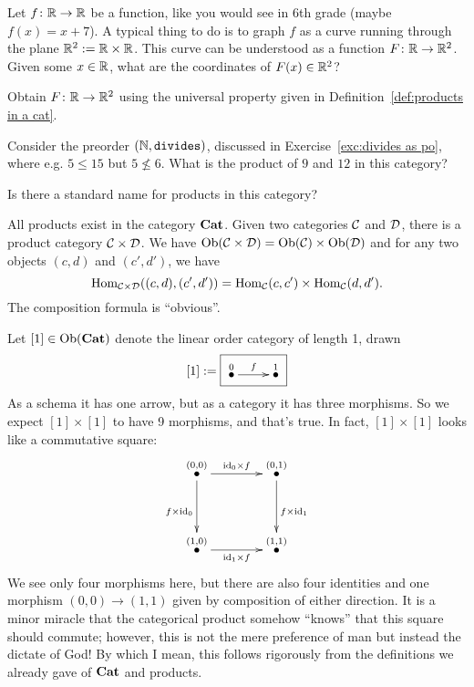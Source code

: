 \documentclass[CT4S-EN-RU]{subfiles}
\begin{document}
\begin{exerciseRUS}
\end{exerciseRUS}

\begin{exerciseENG}
Let $f\colon{\mathbb R}\rightarrow{\mathbb R}$ be a function, like you would see in 6th grade (maybe $f(x)=x+7$). A typical thing to do is to graph $f$ as a curve running through the plane ${\mathbb R}^2:={\mathbb R}\times{\mathbb R}$. This curve can be understood as a function $F\colon{\mathbb R}\rightarrow{\mathbb R}^2$.
\sexc Given some $x\in{\mathbb R}$, what are the coordinates of $F(x)\in{\mathbb R}^2$? 
\item Obtain $F\colon{\mathbb R}\rightarrow{\mathbb R}^2$ using the universal property given in Definition~\ref{def:products in a cat}. 
\endsexc
\end{exerciseENG}

\begin{exerciseRUS}
\end{exerciseRUS}

\begin{exerciseENG}
Consider the preorder $({\mathbb N},{\tt divides})$, discussed in Exercise~\ref{exc:divides as po}, where e.g. $5\leq 15$ but $5\not\leq 6$. \sexc What is the product of $9$ and $12$ in this category?
\item Is there a standard name for products in this category?
\endsexc
\end{exerciseENG}

\begin{exerciseRUS}
\end{exerciseRUS}

\begin{exampleENG}\label{ex:[1]x[1]}
All products exist in the category ${\mathbf{Cat}}$. Given two categories $\mathcal{C}$ and $\mathcal{D}$, there is a product category $\mathcal{C}\times\mathcal{D}$. We have $\textnormal{Ob}(\mathcal{C}\times\mathcal{D})=\textnormal{Ob}(\mathcal{C})\times\textnormal{Ob}(\mathcal{D})$ and for any two objects $(c,d)$ and $(c',d')$, we have $$\textnormal{Hom}_{\mathcal{C}\times\mathcal{D}}((c,d),(c',d'))=\textnormal{Hom}_\mathcal{C}(c,c')\times\textnormal{Hom}_\mathcal{C}(d,d').$$ The composition formula is “obvious”.

Let $[1]\in\textnormal{Ob}({\mathbf{Cat}})$ denote the linear order category of length 1, drawn $$[1]:=\fbox{\xymatrix{\LMO{0}\ar[r]^f&\LMO{1}}}$$ As a schema it has one arrow, but as a category it has three morphisms. So we expect $[1]\times[1]$ to have 9 morphisms, and that's true. In fact, $[1]\times[1]$ looks like a commutative square:
\begin{align}\label{dia:comm square}
\xymatrix@=40pt{
\LMO{(0,0)}\ar[r]^{\id_0\times f}\ar[d]_{f\times\id_0}&\LMO{(0,1)}\ar[d]^{f\times\id_1}\\
\LMO{(1,0)}\ar[r]_{\id_1\times f}&\LMO{(1,1)}}
\end{align}
We see only four morphisms here, but there are also four identities and one morphism $(0,0)\to(1,1)$ given by composition of either direction. It is a minor miracle that the categorical product somehow “knows” that this square should commute; however, this is not the mere preference of man but instead the dictate of God! By which I mean, this follows rigorously from the definitions we already gave of ${\mathbf{Cat}}$ and products.
\end{exampleENG}
\end{document}
